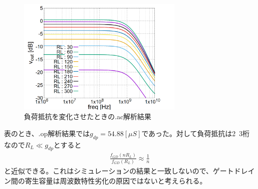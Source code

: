\documentclass[twocolumn]{jsarticle}
\begin{document}
    \begin{figure}[h]
        \begin{center}
            \includegraphics*[width=80mm]{graphes/bitmap/Fgd_vout_ac.PNG}
            \caption{負荷抵抗を変化させたときの.ac解析結果}
            \label{graph:fgd_vout_ac}
        \end{center}
    \end{figure}
    
    表のとき、.op解析結果では$g_{dp}=54.88[\mu S]$であった。対して負荷抵抗は2~3桁なので$R_{L}\ll g_{dp}$とすると
    \begin{align*}
        \frac{f_{GD}(nR_{L})}{f_{GD}(R_{L})}\approx \frac{1}{n}
    \end{align*}
    と近似できる。これはシミュレーションの結果と一致しないので、ゲートドレイン間の寄生容量は周波数特性劣化の原因ではないと考えられる。
\end{document}
